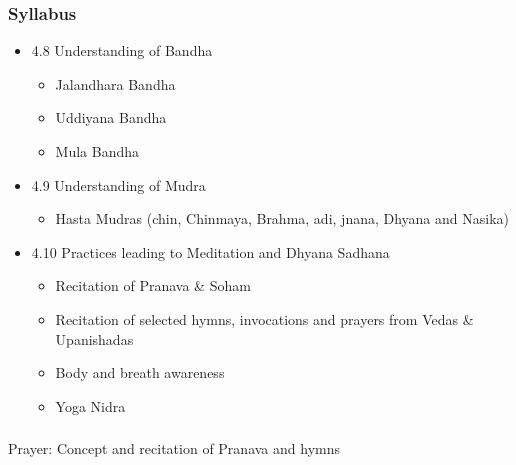 \begin{frame}[fragile]\frametitle{Syllabus}

\begin{itemize}
\item 4.8  Understanding of Bandha  
	\begin{itemize}
	\item Jalandhara Bandha 
	\item Uddiyana Bandha  
	\item Mula Bandha 
	\end{itemize}

\item 4.9    Understanding of Mudra   
	\begin{itemize}
	\item Hasta Mudras (chin, Chinmaya, Brahma, adi, jnana, Dhyana and Nasika) 
	\end{itemize}
	
\item 4.10  Practices leading to Meditation and Dhyana Sadhana   
	\begin{itemize}
	\item  Recitation of Pranava \& Soham 
	\item  Recitation of selected hymns, invocations and prayers from Vedas \& Upanishadas 
	\item  Body and breath awareness  
	\item  Yoga Nidra 
	\end{itemize}
	
\end{itemize}
\end{frame}

\begin{frame}[fragile]\frametitle{}
\begin{center}
{\Large  Prayer: Concept and recitation of Pranava and hymns}
\end{center}
\end{frame}


